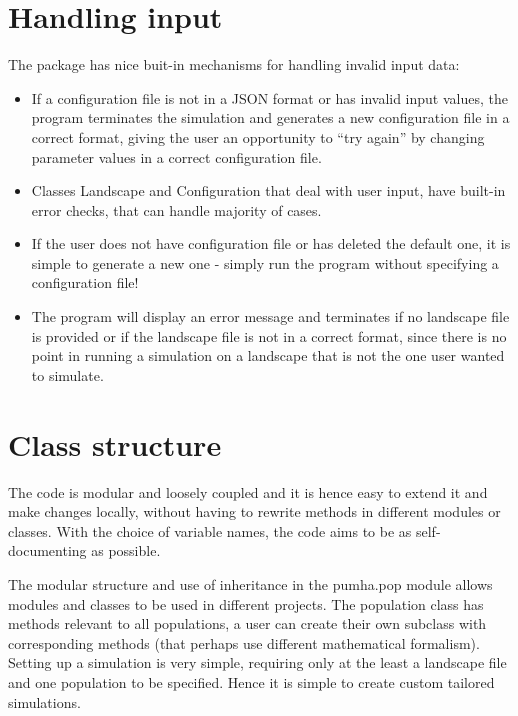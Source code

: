 \documentclass[letterpaper,10pt,english]{sphinxmanual}
\begin{document}
\section{Handling input}
\label{\detokenize{index:handling-input}}
The package has nice buit-in mechanisms for handling invalid input data:
\begin{itemize}
\item {} 
If a configuration file is not in a JSON format or has invalid input values, the program terminates the simulation and generates a new configuration file in a correct format, giving the user an opportunity to “try again” by changing parameter values in a correct configuration file.

\item {} 
Classes Landscape and Configuration that deal with user input, have built-in error checks, that can handle majority of cases.

\item {} 
If the user does not have configuration file or has deleted the default one, it is simple to generate a new one - simply run the program without specifying a configuration file!

\item {} 
The program will display an error message and terminates if no landscape file is provided or if the landscape file is not in a correct format, since there is no point in running a simulation on a landscape that is not the one user wanted to simulate.

\end{itemize}


\section{Class structure}
\label{\detokenize{index:class-structure}}
The code is modular and loosely coupled and it is hence easy to extend it and make changes locally, without having to rewrite methods in different modules or classes. With the choice of variable names, the code aims to be as self-documenting as possible.

The modular structure and use of inheritance in the pumha.pop module allows modules and classes to be used in different projects. The population class has methods relevant to all populations, a user can create their own subclass with corresponding methods (that perhaps use different mathematical formalism). Setting up a simulation is very simple, requiring only at the least a landscape file and one population to be specified. Hence it is simple to create custom tailored simulations.
\end{document}
